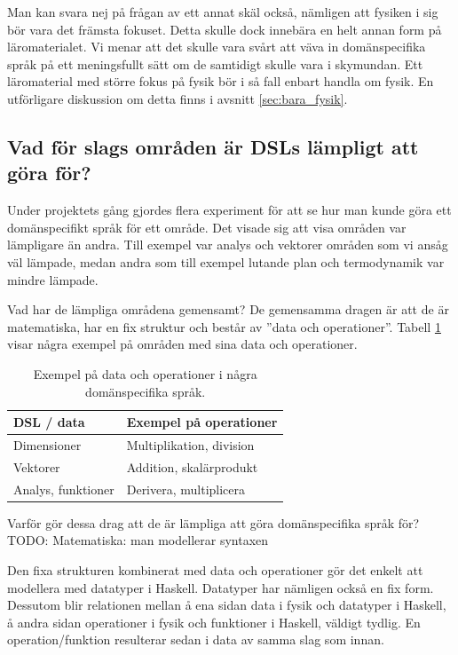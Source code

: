 \begin{binge}
Man kan svara nej på frågan av ett annat skäl också, nämligen att fysiken i sig
bör vara det främsta fokuset. Detta skulle dock innebära en helt annan form på
läromaterialet. Vi menar att det skulle vara svårt att väva in domänspecifika
språk på ett meningsfullt sätt om de samtidigt skulle vara i skymundan. Ett
läromaterial med större fokus på fysik bör i så fall enbart handla om fysik. En
utförligare diskussion om detta finns i avsnitt \ref{sec:bara_fysik}.

\subsection{Vad för slags områden är DSLs lämpligt att göra för?}
\label{sec:lampligt}

Under projektets gång gjordes flera experiment för att se hur man kunde göra ett domänspecifikt språk för ett område. Det visade sig att visa områden var lämpligare än andra. Till exempel var analys och vektorer områden som vi ansåg väl lämpade, medan andra som till exempel lutande plan och termodynamik var mindre lämpade.

Vad har de lämpliga områdena gemensamt? De gemensamma dragen är att de är matematiska, har en fix struktur och består av ''data och operationer''. Tabell \ref{tab:data_och_ops} visar några exempel på områden med sina data och operationer.

\begin{table}[tph]
\centering
\caption{Exempel på data och operationer i några domänspecifika språk.}
\label{tab:data_och_ops}
\begin{tabular}{@{}l|l@{}}
\toprule
DSL / data & Exempel på operationer \\ \midrule
Dimensioner & Multiplikation, division \\
Vektorer & Addition, skalärprodukt \\
Analys, funktioner & Derivera, multiplicera \\ \bottomrule
\end{tabular}
\end{table}

Varför gör dessa drag att de är lämpliga att göra domänspecifika språk för? TODO: Matematiska: man modellerar syntaxen

Den fixa strukturen kombinerat med data och operationer gör det enkelt att modellera med datatyper i Haskell. Datatyper har nämligen också en fix form. Dessutom blir relationen mellan å ena sidan data i fysik och datatyper i Haskell, å andra sidan operationer i fysik och funktioner i Haskell, väldigt tydlig. En operation/funktion resulterar sedan i data av samma slag som innan.


\end{binge}
